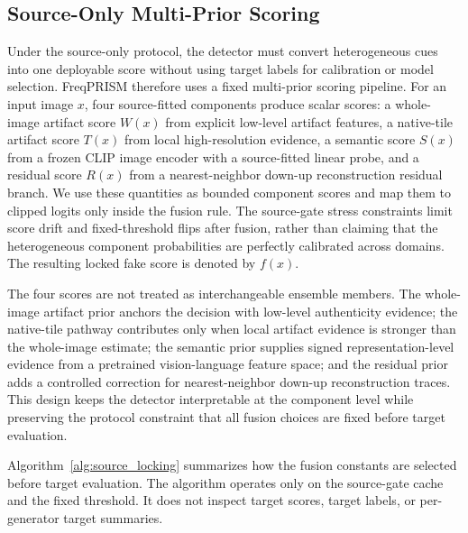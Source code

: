 \documentclass[lettersize,journal]{IEEEtran}
\begin{document}
\subsection{Source-Only Multi-Prior Scoring}
\label{sec:method_scoring}

Under the source-only protocol, the detector must convert heterogeneous cues into one deployable score without using target labels for calibration or model selection. FreqPRISM therefore uses a fixed multi-prior scoring pipeline. For an input image $x$, four source-fitted components produce scalar scores: a whole-image artifact score $W(x)$ from explicit low-level artifact features, a native-tile artifact score $T(x)$ from local high-resolution evidence, a semantic score $S(x)$ from a frozen CLIP image encoder with a source-fitted linear probe, and a residual score $R(x)$ from a nearest-neighbor down-up reconstruction residual branch. We use these quantities as bounded component scores and map them to clipped logits only inside the fusion rule. The source-gate stress constraints limit score drift and fixed-threshold flips after fusion, rather than claiming that the heterogeneous component probabilities are perfectly calibrated across domains. The resulting locked fake score is denoted by $f(x)$.

The four scores are not treated as interchangeable ensemble members. The whole-image artifact prior anchors the decision with low-level authenticity evidence; the native-tile pathway contributes only when local artifact evidence is stronger than the whole-image estimate; the semantic prior supplies signed representation-level evidence from a pretrained vision-language feature space; and the residual prior adds a controlled correction for nearest-neighbor down-up reconstruction traces. This design keeps the detector interpretable at the component level while preserving the protocol constraint that all fusion choices are fixed before target evaluation.

Algorithm~\ref{alg:source_locking} summarizes how the fusion constants are selected before target evaluation. The algorithm operates only on the source-gate cache and the fixed threshold. It does not inspect target scores, target labels, or per-generator target summaries.
\end{document}
